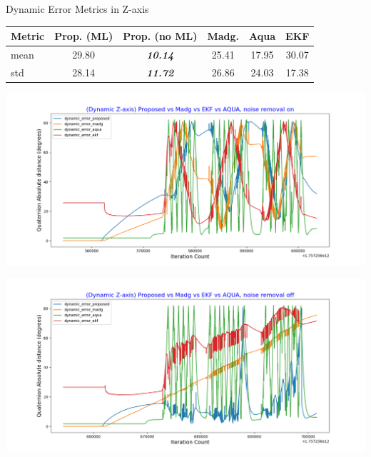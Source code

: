 \documentclass[aspectratio=169,xcolor=dvipsnames]{beamer}
\begin{document}
\begin{frame}{Dynamic Error Metrics in Z-axis}
\small
\begin{minipage}{\textwidth}
  \centering
  \scriptsize
  \label{tab:dynamic_z}
  \begin{tabular}{lccccc}
    \toprule
    Metric & Prop. (ML) & Prop. (no ML) & Madg. & Aqua & EKF \\
    \midrule
    mean & 29.80 & \textit{\textbf{10.14}} & 25.41 & 17.95 & 30.07 \\
    std & 28.14 & \textit{\textbf{11.72}} & 26.86 & 24.03 & 17.38 \\
    \bottomrule
  \end{tabular}
\end{minipage}

\vspace{0.5cm}

\begin{minipage}{0.5\textwidth}
  \centering
  \includegraphics[width=\linewidth,height=0.35\textheight]{graphs/dynamic_ml_z.png}
\end{minipage}%
\hfill
\begin{minipage}{0.5\textwidth}
  \centering
  \includegraphics[width=\linewidth]{graphs/dynamic_no_ml_z.png}
\end{minipage}

\end{frame}
\end{document}
